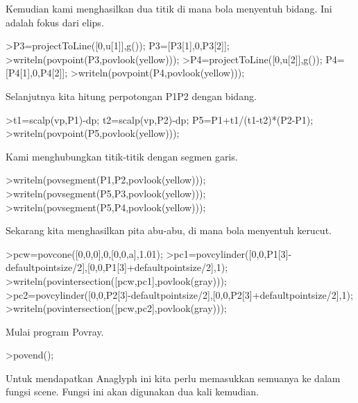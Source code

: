 \documentclass[a4paper,10pt]{article}
\begin{document}
\begin{eulernotebook}
\begin{eulercomment}
\begin{eulercomment}
\begin{eulercomment}
Kemudian kami menghasilkan dua titik di mana bola menyentuh bidang.
Ini adalah fokus dari elips.
\end{eulercomment}
\begin{eulerprompt}
>P3=projectToLine([0,u[1]],g()); P3=[P3[1],0,P3[2]];
>writeln(povpoint(P3,povlook(yellow)));
>P4=projectToLine([0,u[2]],g()); P4=[P4[1],0,P4[2]];
>writeln(povpoint(P4,povlook(yellow)));
\end{eulerprompt}
\begin{eulercomment}
Selanjutnya kita hitung perpotongan P1P2 dengan bidang.
\end{eulercomment}
\begin{eulerprompt}
>t1=scalp(vp,P1)-dp; t2=scalp(vp,P2)-dp; P5=P1+t1/(t1-t2)*(P2-P1);
>writeln(povpoint(P5,povlook(yellow)));
\end{eulerprompt}
\begin{eulercomment}
Kami menghubungkan titik-titik dengan segmen garis.
\end{eulercomment}
\begin{eulerprompt}
>writeln(povsegment(P1,P2,povlook(yellow)));
>writeln(povsegment(P5,P3,povlook(yellow)));
>writeln(povsegment(P5,P4,povlook(yellow)));
\end{eulerprompt}
\begin{eulercomment}
Sekarang kita menghasilkan pita abu-abu, di mana bola menyentuh
kerucut.
\end{eulercomment}
\begin{eulerprompt}
>pcw=povcone([0,0,0],0,[0,0,a],1.01);
>pc1=povcylinder([0,0,P1[3]-defaultpointsize/2],[0,0,P1[3]+defaultpointsize/2],1);
>writeln(povintersection([pcw,pc1],povlook(gray)));
>pc2=povcylinder([0,0,P2[3]-defaultpointsize/2],[0,0,P2[3]+defaultpointsize/2],1);
>writeln(povintersection([pcw,pc2],povlook(gray)));
\end{eulerprompt}
\begin{eulercomment}
Mulai program Povray.
\end{eulercomment}
\begin{eulerprompt}
>povend();
\end{eulerprompt}
\begin{eulercomment}
Untuk mendapatkan Anaglyph ini kita perlu memasukkan semuanya ke dalam
fungsi scene. Fungsi ini akan digunakan dua kali kemudian.
\end{eulercomment}
\begin{eulerprompt}

\end{eulerprompt}
\end{eulercomment}
\end{eulercomment}
\end{eulernotebook}
\end{document}
